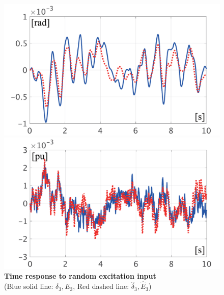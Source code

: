 \documentclass[tombow,dvipdfmx]{corona-a5-1.1}
\begin{document}
\begin{figure}[t]
  \centering
  {
  \begin{minipage}{0.49\linewidth}
    \centering
    \includegraphics[width = 1.0\linewidth]{figs/timedeltamodel}
     \medskip
  \end{minipage}
  \begin{minipage}{0.49\linewidth}
    \centering
    \includegraphics[width = 1.0\linewidth]{figs/timeEmodel}
     \medskip
  \end{minipage}
    }
\caption{\textbf{Time response to random excitation input}
 \\ \centering(Blue solid line: $\delta_3, E_3$, Red dashed line: $\hat{\delta}_3,\hat{E}_3$)
 }
  \label{fig:timeVmodel}
\medskip
\end{figure}
\end{document}
